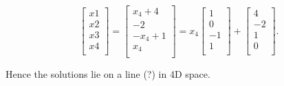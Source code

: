 \documentclass{article}
\begin{document}
\[
    \begin{bmatrix}
        x1 \\ x2 \\ x3 \\ x4 \\
    \end{bmatrix}
    = 
    \begin{bmatrix}
        x_4 + 4     \\
        -2          \\
        - x_4 + 1   \\
        x_4         \\
    \end{bmatrix}
    = 
    x_4
    \begin{bmatrix}
        1 \\ 0 \\ -1 \\ 1 \\ 
    \end{bmatrix}
    + 
    \begin{bmatrix}
        4 \\ -2 \\ 1 \\ 0 \\
    \end{bmatrix}
.\]

Hence the solutions lie on a line (?) in 4D space.






\end{document}
